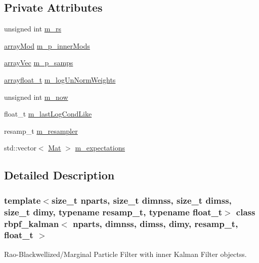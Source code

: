 \subsection*{Private Attributes}
\begin{DoxyCompactItemize}
\item 
unsigned int \hyperlink{classrbpf__kalman_a625192fecb630044a08a445f0abb7cdf}{m\+\_\+rs}
\item 
\hyperlink{classrbpf__kalman_a99e5cb365f01f83962440f29357744d9}{array\+Mod} \hyperlink{classrbpf__kalman_ad6ff53f5ea23c35d3c7154b31a50bb34}{m\+\_\+p\+\_\+inner\+Mods}
\item 
\hyperlink{classrbpf__kalman_ad0c2ef4db6363157244741517daae136}{array\+Vec} \hyperlink{classrbpf__kalman_a88f7188c59b2cc1407a14e60051a1840}{m\+\_\+p\+\_\+samps}
\item 
\hyperlink{classrbpf__kalman_a77493b35e7848d5bd91904701adabbbc}{arrayfloat\+\_\+t} \hyperlink{classrbpf__kalman_a086f86066051a4f955b7b8b922a932af}{m\+\_\+log\+Un\+Norm\+Weights}
\item 
unsigned int \hyperlink{classrbpf__kalman_a0c27a82501d16ed1a8b427c053d47c93}{m\+\_\+now}
\item 
float\+\_\+t \hyperlink{classrbpf__kalman_adb1cf2ea7161d4a6e5a9a7240b9cdff1}{m\+\_\+last\+Log\+Cond\+Like}
\item 
resamp\+\_\+t \hyperlink{classrbpf__kalman_a8ecaad1e77a122988843b2a0a33f882d}{m\+\_\+resampler}
\item 
std\+::vector$<$ \hyperlink{classrbpf__kalman_a736704f31949e04f537aa8b7263e44af}{Mat} $>$ \hyperlink{classrbpf__kalman_ab44eceb581029abcce88710ef7f9c38f}{m\+\_\+expectations}
\end{DoxyCompactItemize}


\subsection{Detailed Description}
\subsubsection*{template$<$size\+\_\+t nparts, size\+\_\+t dimnss, size\+\_\+t dimss, size\+\_\+t dimy, typename resamp\+\_\+t, typename float\+\_\+t$>$\newline
class rbpf\+\_\+kalman$<$ nparts, dimnss, dimss, dimy, resamp\+\_\+t, float\+\_\+t $>$}

Rao-\/\+Blackwellized/\+Marginal Particle Filter with inner Kalman Filter objectss. 

